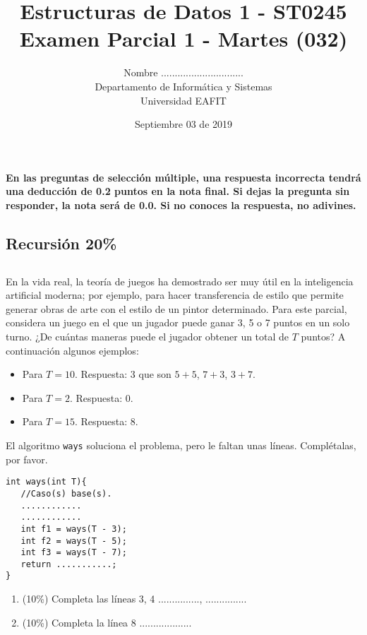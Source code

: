\documentclass[10 pt]{article}
\title{\textbf {Estructuras de Datos 1 - ST0245\\Examen Parcial 1 - Martes (032)
}}
\author{Nombre ..............................\\
		Departamento de Informática y Sistemas\\
		Universidad EAFIT\\}
\date{Septiembre 03 de 2019}
\begin{document}
\lstset{escapechar=@,style=customc, numbers=left, stepnumber = 1} 
\maketitle

\textbf{En las preguntas de selección múltiple, una respuesta incorrecta tendrá
una deducción de 0.2 puntos en la nota final. Si dejas la pregunta sin
responder, la nota será de 0.0. Si no conoces la respuesta, no adivines.}


\begin{multicols}{2}



\section{Recursión 20\%}
\subsection{} En la vida real, la teoría de juegos ha demostrado ser muy útil en la inteligencia artificial moderna; por ejemplo, para hacer transferencia de estilo que permite generar obras de arte con el estilo de un pintor determinado. Para este parcial, considera un juego en el que un jugador puede ganar 3, 5 o 7 puntos en un solo turno. ¿De cuántas maneras puede el jugador obtener un total de $T$ puntos? A continuación algunos ejemplos:
\begin{itemize}
	\item Para $T = 10$. Respuesta: $3$ que son $5 + 5$, $7 + 3$, $3 + 7$.
	\item Para $T = 2$. Respuesta: $0$.
	\item Para $T = 15$. Respuesta: $8$. 
\end{itemize}
El algoritmo \texttt{ways} soluciona el problema, pero le faltan unas líneas. Complétalas, por favor. 
\begin{lstlisting}
int ways(int T){
   //Caso(s) base(s).
   ............
   ............
   int f1 = ways(T - 3);
   int f2 = ways(T - 5);
   int f3 = ways(T - 7);
   return ...........;
}
\end{lstlisting}
\begin{enumerate}[label=\alph*]
	\item (10\%) Completa las líneas 3, 4 ..............., ...............
	\item (10\%) Completa la línea 8 ...................
\end{enumerate}

\end{multicols}
\end{document}
